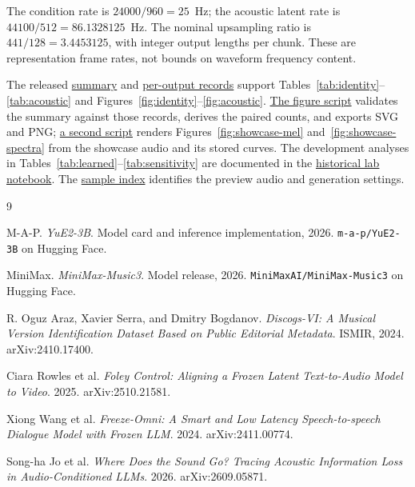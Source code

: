 \documentclass[11pt,a4paper]{article}
\newcommand{\code}[1]{\texttt{#1}}
\begin{document}
The condition rate is $24000/960 = 25$~Hz; the acoustic latent rate is $44100/512 = 86.1328125$~Hz. The nominal upsampling ratio is $441/128 = 3.4453125$, with integer output lengths per chunk. These are representation frame rates, not bounds on waveform frequency content.

The released \href{https://github.com/HenryZ838978/fugue/blob/main/research/eval_summary.json}{summary} and \href{https://github.com/HenryZ838978/fugue/blob/main/research/eval_per_item.json}{per-output records} support Tables~\ref{tab:identity}--\ref{tab:acoustic} and Figures~\ref{fig:identity}--\ref{fig:acoustic}. \href{https://github.com/HenryZ838978/fugue/blob/main/paper/figures/render_figures.py}{The figure script} validates the summary against those records, derives the paired counts, and exports SVG and PNG; \href{https://github.com/HenryZ838978/fugue/blob/main/paper/figures/render_showcase.py}{a second script} renders Figures~\ref{fig:showcase-mel} and~\ref{fig:showcase-spectra} from the showcase audio and its stored curves. The development analyses in Tables~\ref{tab:learned}--\ref{tab:sensitivity} are documented in the \href{https://github.com/HenryZ838978/fugue/blob/main/research/SCION.md}{historical lab notebook}. The \href{https://github.com/HenryZ838978/fugue/blob/main/samples/README.md}{sample index} identifies the preview audio and generation settings.

\begin{thebibliography}{9}
\small\raggedright\setlength{\itemsep}{2pt}
 M-A-P. \emph{YuE2-3B}. Model card and inference implementation, 2026. \code{m-a-p/YuE2-3B} on Hugging Face.

 MiniMax. \emph{MiniMax-Music3}. Model release, 2026. \code{MiniMaxAI/MiniMax-Music3} on Hugging Face.

 R. Oguz Araz, Xavier Serra, and Dmitry Bogdanov. \emph{Discogs-VI: A Musical Version Identification Dataset Based on Public Editorial Metadata}. ISMIR, 2024. arXiv:2410.17400.

 Ciara Rowles et al. \emph{Foley Control: Aligning a Frozen Latent Text-to-Audio Model to Video}. 2025. arXiv:2510.21581.

 Xiong Wang et al. \emph{Freeze-Omni: A Smart and Low Latency Speech-to-speech Dialogue Model with Frozen LLM}. 2024. arXiv:2411.00774.

 Song-ha Jo et al. \emph{Where Does the Sound Go? Tracing Acoustic Information Loss in Audio-Conditioned LLMs}. 2026. arXiv:2609.05871.
\end{thebibliography}
\end{document}
